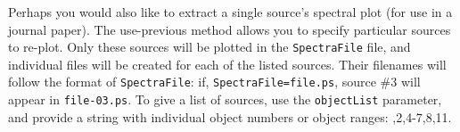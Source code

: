 Perhaps you would also like to extract a single source's
spectral plot (\eg for use in a journal paper). The use-previous
method allows you to specify particular sources to re-plot. Only these
sources will be plotted in the \texttt{SpectraFile} file, and
individual files will be created for each of the listed sources. Their
filenames will follow the format of \texttt{SpectraFile}: if,
\texttt{SpectraFile=file.ps}, source \#3 will appear in
\texttt{file-03.ps}. To give a list of sources, use the
\texttt{objectList} parameter, and provide a string with individual
object numbers or object ranges: ,2,4-7,8,11.


